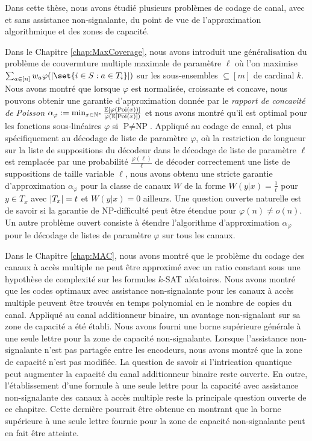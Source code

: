 Dans cette thèse, nous avons étudié plusieurs problèmes de codage de canal, avec et sans assistance non-signalante, du point de vue de l'approximation algorithmique et des zones de capacité.

Dans le Chapitre \ref{chap:MaxCoverage}, nous avons introduit une généralisation du problème de couvermture multiple maximale de paramètre $\ell$ où l'on maximise $\sum_{a \in [n]} w_a\varphi(\abs{\set{i \in S : a \in T_i}})$ sur les sous-ensembles $\subseteq [m]$ de cardinal $k$. Nous avons montré que lorsque $\varphi$ est normalisée, croissante et concave, nous pouvons obtenir une garantie d'approximation donnée par le \emph{rapport de concavité de Poisson} $\alpha_{\varphi} := \min_{x \in \mathbb{N}^*} \frac{\mathbb{E}[\varphi(\operatorname{\text{Poi}}(x))]}{\varphi(\mathbb{E}[\operatorname{\text{Poi}}(x)])}$ et nous avons montré qu'il est optimal pour les fonctions sous-linéaires $\varphi$ si $\textrm{P}\not=\textrm{NP}$. Appliqué au codage de canal, et plus spécifiquement au décodage de liste de paramètre $\varphi$, où la restriction de longueur sur la liste de suppositions du décodeur dans le décodage de liste de paramètre $\ell$ est remplacée par une probabilité $\frac{\varphi(\ell)}{\ell}$ de décoder correctement une liste de suppositions de taille variable $\ell$, nous avons obtenu une stricte garantie d'approximation $\alpha_{\varphi}$ pour la classe de canaux $W$ de la forme $W(y|x) = \frac{1}{t}$ pour $y \in T_x$ avec $\abs{T_x}=t$ et $W(y|x) = 0$ ailleurs. Une question ouverte naturelle est de savoir si la garantie de \textrm{NP}-difficulté peut être étendue pour $\varphi(n) \not= o(n)$. Un autre problème ouvert consiste à étendre l'algorithme d'approximation $\alpha_{\varphi}$ pour le décodage de listes de paramètre $\varphi$ sur tous les canaux.

Dans le Chapitre \ref{chap:MAC}, nous avons montré que le problème du codage des canaux à accès multiple ne peut être approximé avec un ratio constant sous une hypothèse de complexité sur les formules $k$-SAT aléatoires. Nous avons montré que les codes optimaux avec assistance non-signalante pour les canaux à accès multiple peuvent être trouvés en temps polynomial en le nombre de copies du canal. Appliqué au canal additionneur binaire, un avantage non-signalant sur sa zone de capacité a été établi. Nous avons fourni une borne supérieure générale à une seule lettre pour la zone de capacité non-signalante. Lorsque l'assistance non-signalante n'est pas partagée entre les encodeurs, nous avons montré que la zone de capacité n'est pas modifiée. La question de savoir si l'intrication quantique peut augmenter la capacité du canal additionneur binaire reste ouverte. En outre, l'établissement d'une formule à une seule lettre pour la capacité avec assistance non-signalante des canaux à accès multiple reste la principale question ouverte de ce chapitre. Cette dernière pourrait être obtenue en montrant que la borne supérieure à une seule lettre fournie pour la zone de capacité non-signalante peut en fait être atteinte.

